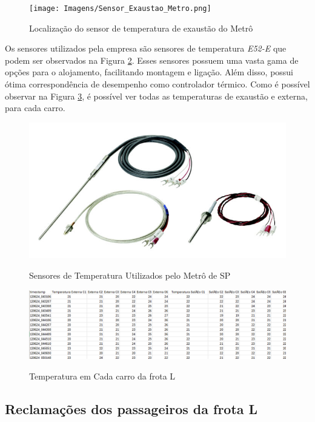 \documentclass[acronym,symbols,table]{fei}
\begin{document}
     \begin{figure}[!htb]
    \centering
    \caption{Localização do sensor de temperatura de exaustão do Metrô}
    \texttt{[image: Imagens/Sensor\_Exaustao\_Metro.png]}
    \label{fig:Sensor_Exaustao_Metro}
    \end{figure}   
    
\newpage
    Os sensores utilizados pela empresa são sensores de temperatura \textit{E52-E} que podem ser observados na Figura \ref{fig:Sensores_Metro}. Esses sensores possuem uma vasta gama de opções para o alojamento, facilitando montagem e ligação. Além disso, possui ótima correspondência de desempenho como controlador térmico. Como é possível observar na Figura \ref{fig:Temperatura_Carros}, é possível ver todas as temperaturas de exaustão e externa, para cada carro.
    
    
    \begin{figure}[!htb]
    \centering
    \caption{Sensores de Temperatura Utilizados pelo Metrô de SP}
    \includegraphics[width=0.6\linewidth]{Imagens/Sensor_Metro.jpg}
    \label{fig:Sensores_Metro}
    \end{figure}

    \begin{figure}[!htb]
    \centering
    \caption{Temperatura em Cada carro da frota L}
    \includegraphics[width=1\linewidth]{Imagens/Temperatura_Carros.png}
    \label{fig:Temperatura_Carros}
    \end{figure}

\subsection{Reclamações dos passageiros da frota L}
\end{document}
